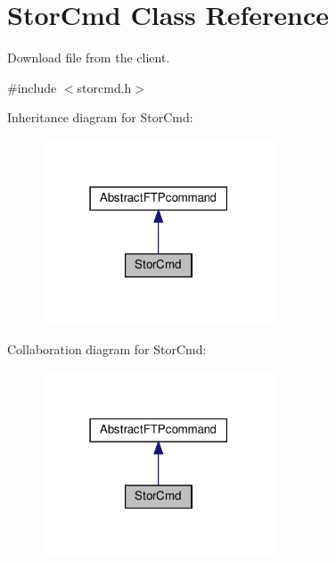 \hypertarget{classStorCmd}{}\section{Stor\+Cmd Class Reference}
\label{classStorCmd}


Download file from the client.  




{\ttfamily \#include $<$storcmd.\+h$>$}



Inheritance diagram for Stor\+Cmd\+:\nopagebreak
\begin{figure}[H]
\begin{center}
\leavevmode
\includegraphics[width=195pt]{dc/dd3/classStorCmd__inherit__graph}
\end{center}
\end{figure}


Collaboration diagram for Stor\+Cmd\+:\nopagebreak
\begin{figure}[H]
\begin{center}
\leavevmode
\includegraphics[width=195pt]{d4/d93/classStorCmd__coll__graph}
\end{center}
\end{figure}
